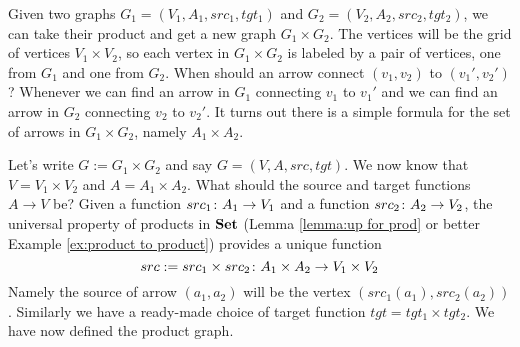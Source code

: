 \documentclass[CT4S-EN-RU]{subfiles}
\begin{document}
\begin{exampleENG}\label{ex:product of graphs}
Given two graphs $G_1=(V_1,A_1,src_1,tgt_1)$ and $G_2=(V_2,A_2,src_2,tgt_2)$, we can take their product and get a new graph $G_1\times G_2$. The vertices will be the grid of vertices $V_1\times V_2$, so each vertex in $G_1\times G_2$ is labeled by a pair of vertices, one from $G_1$ and one from $G_2$. When should an arrow connect $(v_1,v_2)$ to $(v_1',v_2')$? Whenever we can find an arrow in $G_1$ connecting $v_1$ to $v_1'$ and we can find an arrow in $G_2$ connecting $v_2$ to $v_2'$. It turns out there is a simple formula for the set of arrows in $G_1\times G_2$, namely $A_1\times A_2$.

Let's write $G:=G_1\times G_2$ and say $G=(V,A,src,tgt)$. We now know that $V=V_1\times V_2$ and $A=A_1\times A_2$. What should the source and target functions $A\to V$ be? Given a function $src_1\colon A_1\rightarrow V_1$ and a function $src_2\colon A_2\rightarrow V_2$, the universal property of products in ${\mathbf{Set}}$ (Lemma \ref{lemma:up for prod} or better Example \ref{ex:product to product}) provides a unique function 
$$src:=src_1\times src_2\colon A_1\times A_2\rightarrow V_1\times V_2$$ 
Namely the source of arrow $(a_1,a_2)$ will be the vertex $(src_1(a_1),src_2(a_2))$. Similarly we have a ready-made choice of target function $tgt=tgt_1\times tgt_2$. We have now defined the product graph.


\end{exampleENG}
\end{document}
